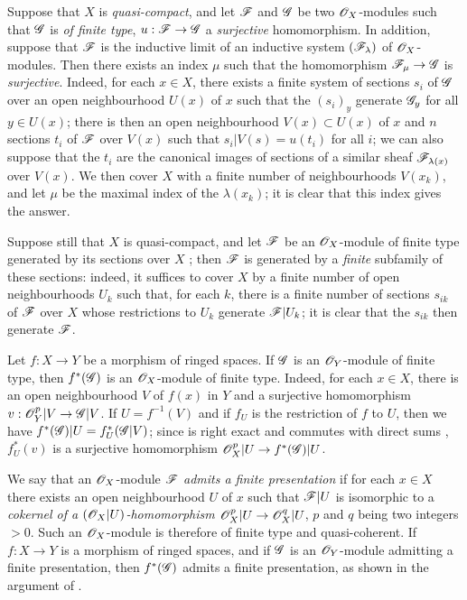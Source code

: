 \begin{env}[5.2.3]
\label{0.5.2.3}
Suppose that $X$ is \emph{quasi-compact}, and let $\mathscr{F}$ and $\mathscr{G}$ be two $\mathscr{O}_X$-modules such that $\mathscr{G}$ is \emph{of finite type}, $u:\sh{F}\to\sh{G}$ a \emph{surjective} homomorphism.
In addition, suppose that $\mathscr{F}$ is the inductive limit of an inductive system $(\mathscr{F}_\lambda)$ of $\mathscr{O}_X$-modules.
Then there exists an index $\mu$ such that the homomorphism $\sh{F}_\mu\to\sh{G}$ is \emph{surjective}.
Indeed, for each $x\in X$, there exists a finite system of sections $s_i$ of $\mathscr{G}$ over an open neighbourhood $U(x)$ of $x$ such that the $(s_i)_y$ generate $\mathscr{G}_y$ for all $y\in U(x)$;
there is then an open neighbourhood $V(x)\subset U(x)$ of $x$ and $n$ sections $t_i$ of $\mathscr{F}$ over $V(x)$ such that $s_i|V(s)=u(t_i)$ for all $i$;
we can also suppose that the $t_i$ are the canonical images of sections of a similar sheaf $\mathscr{F}_{\lambda(x)}$ over $V(x)$.
We then cover $X$ with a finite number of neighbourhoods $V(x_k)$, and let $\mu$ be the maximal index of the $\lambda(x_k)$;
it is clear that this index gives the answer.

Suppose still that $X$ is quasi-compact, and let $\mathscr{F}$ be an $\mathscr{O}_X$-module of finite type generated by its sections over $X$ ;
then $\mathscr{F}$ is generated by a \emph{finite} subfamily of these sections:
indeed, it suffices to cover $X$ by a finite number of open neighbourhoods $U_k$ such that, for each $k$, there is a finite number of sections $s_{ik}$ of $\mathscr{F}$ over $X$ whose restrictions to $U_k$ generate $\mathscr{F}|U_k$;
it is clear that the $s_{ik}$ then generate $\mathscr{F}$.
\end{env}

\begin{env}[5.2.4]
\label{0.5.2.4}
Let $f:X\to Y$ be a morphism of ringed spaces.
If $\mathscr{G}$ is an $\mathscr{O}_Y$-module of finite type, then $f^*(\mathscr{G})$ is an $\mathscr{O}_X$-module of finite type.
Indeed, for each $x\in X$, there is an open neighbourhood $V$ of $f(x)$ in $Y$ and a surjective homomorphism $v:\sh{O}_Y^p|V\to\sh{G}|V$.
If $U=f^{-1}(V)$ and if $f_U$ is the restriction of $f$ to $U$, then we have $f^*(\mathscr{G})|U=f_U^*(\mathscr{G}|V)$;
since  is right exact  and commutes with direct sums , $f_U^*(v)$ is a surjective homomorphism $\sh{O}_X^p|U\to f^*(\sh{G})|U$.
\end{env}

\begin{env}[5.2.5]
\label{0.5.2.5}
We say that an $\mathscr{O}_X$-module $\mathscr{F}$ \emph{admits a finite presentation} if for each $x\in X$ there exists an open neighbourhood $U$ of $x$ such that $\mathscr{F}|U$ is isomorphic to a \emph{cokernel of a $(\mathscr{O}_X|U)$-homomorphism $\sh{O}_X^p|U\to\sh{O}_X^q|U$}, $p$ and $q$ being two integers $>0$.
Such an $\mathscr{O}_X$-module is therefore of finite type and quasi-coherent.
If $f:X\to Y$ is a morphism of ringed spaces, and if $\mathscr{G}$ is an $\mathscr{O}_Y$-module admitting a finite presentation, then $f^*(\mathscr{G})$ admits a finite presentation, as shown in the argument of .
\end{env}

